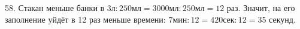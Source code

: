 58. Стакан меньше банки в $3\text{л}:250\text{мл}=3000\text{мл}:250\text{мл}=12$ раз. Значит, на его заполнение уйдёт в 12 раз меньше времени: $7\text{мин}:12=420\text{сек}:12=35$ секунд.\\
